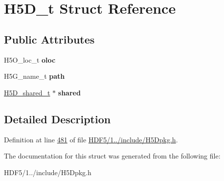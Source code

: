 \hypertarget{struct_h5_d__t}{}\section{H5\+D\+\_\+t Struct Reference}
\label{struct_h5_d__t}
\subsection*{Public Attributes}
\begin{DoxyCompactItemize}
\item 
\mbox{\label{struct_h5_d__t_a0e1ee704921f63ef399252479f608511}} 
H5\+O\+\_\+loc\+\_\+t {\bfseries oloc}
\item 
\mbox{\label{struct_h5_d__t_a65e8fdf561e8b839676e203ca9bd3398}} 
H5\+G\+\_\+name\+\_\+t {\bfseries path}
\item 
\mbox{\label{struct_h5_d__t_a81eeba462c594f51530d2c51f24fee7a}} 
\hyperlink{struct_h5_d__shared__t}{H5\+D\+\_\+shared\+\_\+t} $\ast$ {\bfseries shared}
\end{DoxyCompactItemize}


\subsection{Detailed Description}


Definition at line \hyperlink{_h_d_f5_21_810_81_2include_2_h5_dpkg_8h_source_l00481}{481} of file \hyperlink{_h_d_f5_21_810_81_2include_2_h5_dpkg_8h_source}{H\+D\+F5/1../include/\+H5\+Dpkg.\+h}.



The documentation for this struct was generated from the following file\+:\begin{DoxyCompactItemize}
\item 
H\+D\+F5/1../include/\+H5\+Dpkg.\+h\end{DoxyCompactItemize}
